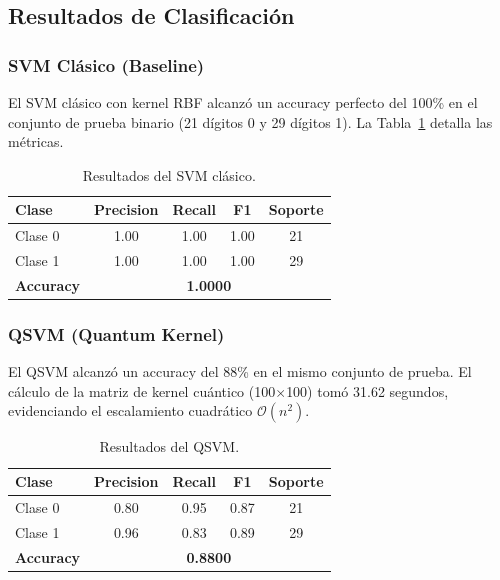 \documentclass[conference]{IEEEtran}
\begin{document}
\subsection{Resultados de Clasificación}

\subsubsection{SVM Clásico (Baseline)}

El SVM clásico con kernel RBF alcanzó un accuracy perfecto del 100\% en el 
conjunto de prueba binario (21 dígitos 0 y 29 dígitos 1). La Tabla~\ref{tab:svm} 
detalla las métricas.

\begin{table}[H]
    \centering
    \caption{Resultados del SVM clásico.}
    \label{tab:svm}
    \begin{tabular}{lcccc}
        \toprule
        \textbf{Clase} & \textbf{Precision} & \textbf{Recall} & \textbf{F1} & \textbf{Soporte} \\
        \midrule
        Clase 0 & 1.00 & 1.00 & 1.00 & 21 \\
        Clase 1 & 1.00 & 1.00 & 1.00 & 29 \\
        \midrule
        \textbf{Accuracy} & \multicolumn{4}{c}{\textbf{1.0000}} \\
        \bottomrule
    \end{tabular}
\end{table}

\subsubsection{QSVM (Quantum Kernel)}

El QSVM alcanzó un accuracy del 88\% en el mismo conjunto de prueba. El cálculo 
de la matriz de kernel cuántico (100$\times$100) tomó 31.62 segundos, evidenciando 
el escalamiento cuadrático $\mathcal{O}(n^2)$.

\begin{table}[H]
    \centering
    \caption{Resultados del QSVM.}
    \label{tab:qsvm}
    \begin{tabular}{lcccc}
        \toprule
        \textbf{Clase} & \textbf{Precision} & \textbf{Recall} & \textbf{F1} & \textbf{Soporte} \\
        \midrule
        Clase 0 & 0.80 & 0.95 & 0.87 & 21 \\
        Clase 1 & 0.96 & 0.83 & 0.89 & 29 \\
        \midrule
        \textbf{Accuracy} & \multicolumn{4}{c}{\textbf{0.8800}} \\
        \bottomrule
    \end{tabular}
\end{table}
\end{document}
